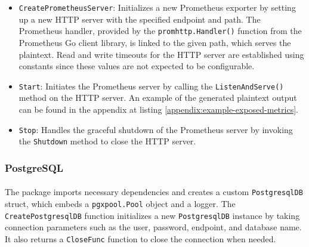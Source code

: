 \documentclass[12pt, conference, final, a4paper, onecolumn, compsoc]{IEEEtran}
\begin{document}
\begin{itemize}
  \item \texttt{CreatePrometheusServer}: Initializes a new Prometheus exporter
        by setting up a new HTTP server with the specified endpoint and path.
        The Prometheus handler, provided by the \texttt{promhttp.Handler()}
        function from the Prometheus Go client library, is linked to the given
        path, which serves the plaintext. Read and write timeouts for the HTTP
        server are established using constants since these values are not
        expected to be configurable.
  \item \texttt{Start}: Initiates the Prometheus server by calling the
        \texttt{ListenAndServe()} method on the HTTP server. An example of the
        generated plaintext output can be found in the appendix at listing
        \ref{appendix:example-exposed-metrics}.
  \item \texttt{Stop}: Handles the graceful shutdown of the Prometheus server by
        invoking the \texttt{Shutdown} method to close the HTTP server.
\end{itemize}

\subsubsection*{PostgreSQL}
\paragraph{}

The package imports necessary dependencies and creates a custom
\texttt{PostgresqlDB} struct, which embeds a \texttt{pgxpool.Pool} object and a
logger. The \texttt{CreatePostgresqlDB} function initializes a new
\texttt{PostgresqlDB} instance by taking connection parameters such as the user,
password, endpoint, and database name. It also returns a \texttt{CloseFunc}
function to close the connection when needed.
\end{document}
